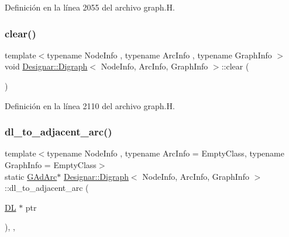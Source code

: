 Definición en la línea 2055 del archivo graph.\+H.

\mbox{\label{class_designar_1_1_digraph_a1ec067a8df6129b27e4d79c9c2755899}} 
\subsubsection{\texorpdfstring{clear()}{clear()}}
{\footnotesize\ttfamily template$<$typename Node\+Info , typename Arc\+Info , typename Graph\+Info $>$ \\
void \hyperlink{class_designar_1_1_digraph}{Designar\+::\+Digraph}$<$ Node\+Info, Arc\+Info, Graph\+Info $>$\+::clear (\begin{DoxyParamCaption}{ }\end{DoxyParamCaption})}



Definición en la línea 2110 del archivo graph.\+H.

\mbox{\label{class_designar_1_1_digraph_afe3162bf2e56b177e7ee1a938ae2af8b}} 
\subsubsection{\texorpdfstring{dl\+\_\+to\+\_\+adjacent\+\_\+arc()}{dl\_to\_adjacent\_arc()}}
{\footnotesize\ttfamily template$<$typename Node\+Info , typename Arc\+Info  = Empty\+Class, typename Graph\+Info  = Empty\+Class$>$ \\
static \hyperlink{class_designar_1_1_digraph_a0c6d846f23d1e82556fb6055557df53f}{G\+Ad\+Arc}$\ast$ \hyperlink{class_designar_1_1_digraph}{Designar\+::\+Digraph}$<$ Node\+Info, Arc\+Info, Graph\+Info $>$\+::dl\+\_\+to\+\_\+adjacent\+\_\+arc (\begin{DoxyParamCaption}\item[{\hyperlink{class_designar_1_1_d_l}{DL} $\ast$}]{ptr }\end{DoxyParamCaption})\hspace{0.3cm}{\ttfamily [inline]}, {\ttfamily [static]}, {\ttfamily [protected]}}



